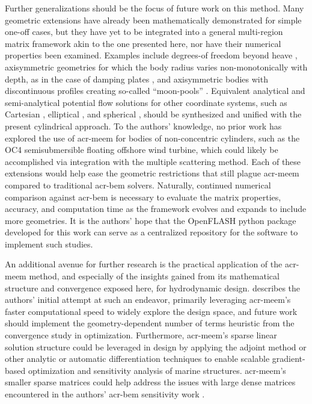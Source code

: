 \documentclass[lineno]{JFM-FLM_Au}
\begin{document}
Further generalizations should be the focus of future work on this method.
Many geometric extensions have already been mathematically demonstrated for simple one-off cases, but they have yet to be integrated into a general multi-region matrix framework akin to the one presented here, nor have their numerical properties been examined.
Examples include degrees-of freedom beyond heave \citep{yeung_added_1981}, axisymmetric geometries for which the body radius varies non-monotonically with depth, as in the case of damping plates \citep{olaya_hydrodynamic_2015}, and axisymmetric bodies with discontinuous profiles creating so-called ``moon-pools'' \citep{seah_symmetric_2006}.
Equivalent analytical and semi-analytical potential flow solutions for other coordinate systems, such as Cartesian \citep{michele_theory_2016,renzi_hydrodynamics_2013}, elliptical \citep{nguyen_theoretical_2024,nguyen_theoretical_2024-1}, and spherical \citep{chatjigeorgiou_analytical_2018}, 
should be synthesized and unified with the present cylindrical approach.
To the authors' knowledge, no prior work has explored the use of \gls{acr-meem} for bodies of non-concentric cylinders, such as the OC4 semisubmersible floating offshore wind turbine, which could likely be accomplished via integration with the multiple scattering method. 
Each of these extensions would help ease the geometric restrictions that still plague \gls{acr-meem} compared to traditional \gls{acr-bem} solvers.
Naturally, continued numerical comparison against \gls{acr-bem} is necessary to evaluate the matrix properties, accuracy, and computation time as the framework evolves and expands to include more geometries.
It is the authors' hope that the OpenFLASH python package developed for this work can serve as a centralized repository for the software to implement such studies.

An additional avenue for further research is the practical application of the \gls{acr-meem} method, and especially of the insights gained from its mathematical structure and convergence \behaviour{} exposed here, for hydrodynamic design.
\citet{mccabe_development_2026} describes the authors' initial attempt at such an endeavor, primarily leveraging \gls{acr-meem}'s faster computational speed to widely explore the design space, and future work should implement the geometry-dependent number of terms heuristic from the convergence study in optimization.
Furthermore, \gls{acr-meem}'s sparse linear solution structure could be leveraged in design by applying the adjoint method or other analytic or automatic differentiation techniques to enable scalable gradient-based optimization and sensitivity analysis of marine structures.
\gls{acr-meem}'s smaller sparse matrices could help address the issues with large dense matrices encountered in the authors' \gls{acr-bem} sensitivity work \citep{khanal_fully_2025}.
\end{document}
